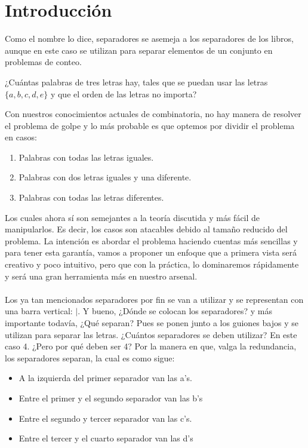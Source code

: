 \documentclass[12pt]{article}
\begin{document}
\section{Introducción}
Como  el  nombre  lo  dice,  separadores  se  asemeja  a  los  separadores de los libros, aunque en este caso se utilizan para separar elementos de un conjunto en problemas de conteo.
\begin{ejemplo}
¿Cuántas palabras de tres letras hay, tales que se puedan usar las letras $\{a,b,c,d,e\}$ y que el orden de las letras no importa?    
\end{ejemplo}
\begin{solucion}
Con nuestros conocimientos actuales de combinatoria, no hay manera de resolver el problema de golpe y lo más probable es que optemos por dividir el problema en casos:
\begin{enumerate}
    \item Palabras con todas las letras iguales.
    \item Palabras con dos letras iguales y una diferente.
    \item Palabras con todas las letras diferentes.
\end{enumerate}
Los cuales ahora sí son semejantes a la teoría discutida y más fácil de manipularlos. Es decir, los casos son atacables debido al tamaño reducido del problema. La intención es abordar el problema haciendo cuentas más sencillas y para tener esta garantía, vamos a proponer un enfoque que a primera vista será creativo y poco intuitivo, pero que con la práctica, lo dominaremos rápidamente y será una gran herramienta más en nuestro arsenal.\\\\
Los ya tan mencionados separadores por fin se van a utilizar y se representan con una barra vertical: $|$.
Y bueno, ¿Dónde se colocan los separadores? y más importante todavía, ¿Qué separan? Pues se ponen junto a los guiones bajos y se utilizan para separar las letras. ¿Cuántos separadores se deben utilizar? En este caso 4. ¿Pero por qué deben ser 4? Por la manera en que, valga la redundancia, los separadores separan, la cual es como sigue:
\begin{itemize}
    \item A la izquierda del primer separador van las a’s.
    \item Entre el primer y el segundo separador van las b’s
    \item Entre el segundo y tercer separador van las c’s.
    \item Entre el tercer y el cuarto separador van las d’s

\end{itemize}
\end{solucion}
\end{document}
